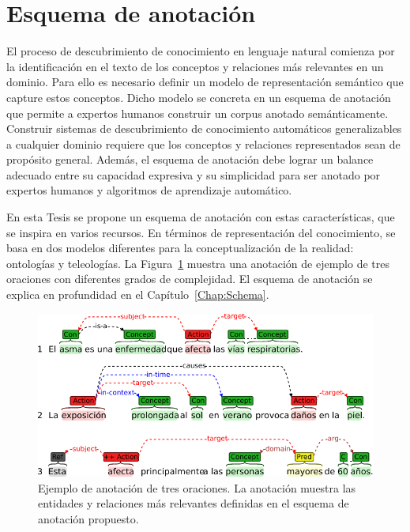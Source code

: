\section{Esquema de anotación}\label{results:schema}

El proceso de descubrimiento de conocimiento en lenguaje natural comienza por la identificación en el texto de los conceptos y relaciones más relevantes en un dominio. Para ello es necesario definir un modelo de representación semántico que capture estos conceptos. Dicho modelo se concreta en un esquema de anotación que permite a expertos humanos construir un corpus anotado semánticamente. Construir sistemas de descubrimiento de conocimiento automáticos generalizables a cualquier dominio requiere que los conceptos y relaciones representados sean de propósito general. Además, el esquema de anotación debe lograr un balance adecuado entre su capacidad expresiva y su simplicidad para ser anotado por expertos humanos y algoritmos de aprendizaje automático.

En esta Tesis se propone un esquema de anotación con estas características, que se inspira en varios recursos.
En términos de representación del conocimiento, se basa en dos modelos diferentes para la conceptualización de la realidad: ontologías y teleologías.
La Figura~\ref{fig:example} muestra una anotación de ejemplo de tres oraciones con diferentes grados de complejidad.
El esquema de anotación se explica en profundidad en el Capítulo~\ref{Chap:Schema}.

\begin{figure}[htb]
    \includegraphics[width=\textwidth]{Images/Chapters/ExampleSentences.pdf}
    \caption[Ejemplos de anotación.]{Ejemplo de anotación de tres oraciones. La anotación muestra las entidades y relaciones más relevantes definidas en el esquema de anotación propuesto.}
    \label{fig:example}
\end{figure}

